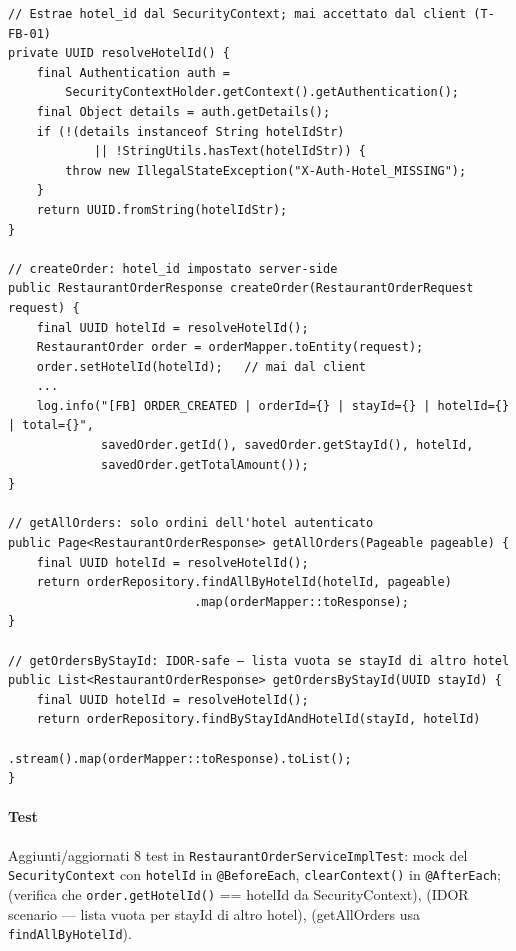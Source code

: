 ﻿\documentclass[a4paper,12pt]{report}
\begin{document}
\begin{securebox}[title={Codice Sicuro --- RestaurantOrderServiceImpl.java (hotel-scoped)}]
\begin{lstlisting}[style=java]
// Estrae hotel_id dal SecurityContext; mai accettato dal client (T-FB-01)
private UUID resolveHotelId() {
    final Authentication auth =
        SecurityContextHolder.getContext().getAuthentication();
    final Object details = auth.getDetails();
    if (!(details instanceof String hotelIdStr)
            || !StringUtils.hasText(hotelIdStr)) {
        throw new IllegalStateException("X-Auth-Hotel_MISSING");
    }
    return UUID.fromString(hotelIdStr);
}

// createOrder: hotel_id impostato server-side
public RestaurantOrderResponse createOrder(RestaurantOrderRequest request) {
    final UUID hotelId = resolveHotelId();
    RestaurantOrder order = orderMapper.toEntity(request);
    order.setHotelId(hotelId);   // mai dal client
    ...
    log.info("[FB] ORDER_CREATED | orderId={} | stayId={} | hotelId={} | total={}",
             savedOrder.getId(), savedOrder.getStayId(), hotelId,
             savedOrder.getTotalAmount());
}

// getAllOrders: solo ordini dell'hotel autenticato
public Page<RestaurantOrderResponse> getAllOrders(Pageable pageable) {
    final UUID hotelId = resolveHotelId();
    return orderRepository.findAllByHotelId(hotelId, pageable)
                          .map(orderMapper::toResponse);
}

// getOrdersByStayId: IDOR-safe — lista vuota se stayId di altro hotel
public List<RestaurantOrderResponse> getOrdersByStayId(UUID stayId) {
    final UUID hotelId = resolveHotelId();
    return orderRepository.findByStayIdAndHotelId(stayId, hotelId)
                          .stream().map(orderMapper::toResponse).toList();
}
\end{lstlisting}
\end{securebox}

\paragraph{Test} Aggiunti/aggiornati 8 test in \texttt{RestaurantOrderServiceImplTest}:
mock del \texttt{SecurityContext} con \texttt{hotelId} in \texttt{@BeforeEach},
\texttt{clearContext()} in \texttt{@AfterEach};
\texttt{} (verifica che \texttt{order.getHotelId()} == hotelId da SecurityContext),
\texttt{} (IDOR scenario --- lista vuota per stayId di altro hotel),
\texttt{} (getAllOrders usa \texttt{findAllByHotelId}).
\end{document}
